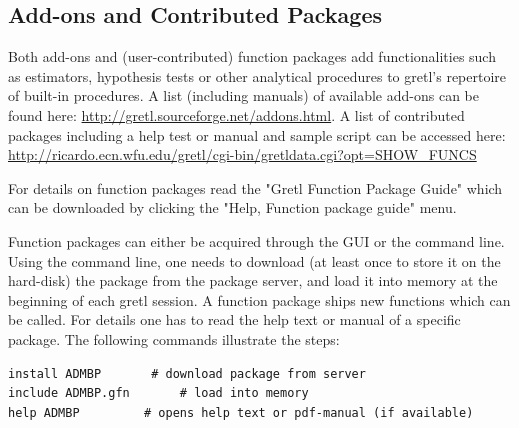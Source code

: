 \documentclass[11pt]{article}
\newcommand{\remph}[1]{{\color{myred}#1}}
\begin{document}
\subsection{Add-ons and Contributed Packages}
\label{sec:addon}
Both add-ons and (user-contributed) function packages add functionalities such as estimators, hypothesis tests or other analytical procedures to gretl's repertoire of built-in procedures. A list (including manuals) of available add-ons can be found here: \url{http://gretl.sourceforge.net/addons.html}. A list of contributed packages including a help test or manual and sample script can be accessed here: \url{http://ricardo.ecn.wfu.edu/gretl/cgi-bin/gretldata.cgi?opt=SHOW_FUNCS}

For details on function packages read the "Gretl Function Package Guide" which can be downloaded by clicking the "Help, Function package guide" menu.

Function packages can either be acquired through the GUI or the command line. Using the command line, one needs to download (at least once to store it on the hard-disk) the package from the package server, and load it into memory at the beginning of each gretl session. A function package ships new functions which can be called. For details one has to read the help text or manual of a specific package. The following commands illustrate the steps:
\begin{Verbatim}[baselinestretch=0.75, frame=single, fontsize=\small]
install ADMBP		# download package from server
include ADMBP.gfn	    # load into memory
help ADMBP		   # opens help text or pdf-manual (if available)
\end{Verbatim}




%
\end{document}
